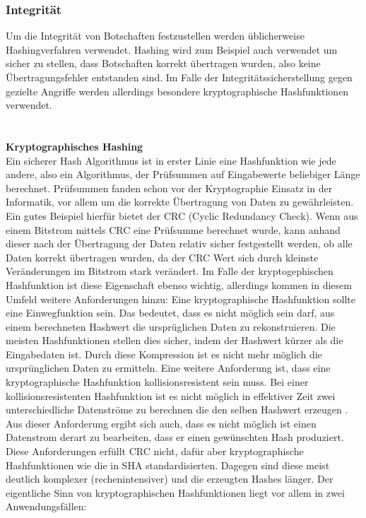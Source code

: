 \documentclass[13pt,a4paper,bibliography=totocnumbered,listof=totocnumbered]{scrartcl}
\begin{document}
\subsubsection{Integrität}
Um die Integrität von Botschaften festzustellen werden üblicherweise Hashingverfahren verwendet. Hashing wird zum Beispiel auch verwendet um sicher zu stellen, dass Botschaften korrekt übertragen wurden, also keine Übertragungsfehler entstanden sind. Im Falle der Integritätssicherstellung gegen gezielte Angriffe werden allerdings besondere kryptographische Hashfunktionen verwendet.\\
 \cite[S. 15]{48}  \cite[S. 2]{42}\\
\\\textbf{Kryptographisches Hashing}\\
Ein sicherer Hash Algorithmus ist in erster Linie eine Hashfunktion wie jede andere, also ein Algorithmus, der Prüfsummen auf Eingabewerte beliebiger Länge berechnet. Prüfsummen fanden schon vor der Kryptographie Einsatz in der Informatik, vor allem um die korrekte Übertragung von Daten zu gewährleisten. Ein gutes Beispiel hierfür bietet der CRC (Cyclic Redundancy Check). Wenn aus einem Bitstrom mittels CRC eine Prüfsumme berechnet wurde, kann anhand dieser nach der Übertragung der Daten relativ sicher festgestellt werden, ob alle Daten korrekt übertragen wurden, da der CRC Wert sich durch kleinste Veränderungen im Bitstrom stark verändert. Im Falle der kryptogephischen Hashfunktion ist diese Eigenschaft ebenso wichtig, allerdings kommen  in diesem Umfeld weitere Anforderungen hinzu: Eine kryptographische Hashfunktion sollte eine Einwegfunktion sein. Das bedeutet, dass es nicht möglich sein darf, aus einem berechneten Hashwert die ursprüglichen Daten zu rekonstruieren. Die meisten Hashfunktionen stellen dies sicher, indem der Hashwert kürzer als die Eingabedaten ist. Durch diese Kompression ist es nicht mehr möglich die ursprünglichen Daten zu ermitteln. Eine weitere Anforderung ist, dass eine kryptographische Hashfunktion kollisionsresistent sein muss. Bei einer kollisionsresistenten Hashfunktion ist es nicht möglich in effektiver Zeit zwei unterschiedliche Datenströme zu berechnen die den selben Hashwert erzeugen \cite[S. 4]{12}. Aus dieser Anforderung ergibt sich auch, dass es nicht möglich ist einen Datenstrom derart zu bearbeiten, dass er einen gewünschten Hash produziert. Diese Anforderungen erfüllt CRC nicht, dafür aber kryptographische Hashfunktionen wie die in SHA standardisierten. Dagegen sind diese meist deutlich komplexer (rechenintensiver) und die erzeugten Hashes länger. Der eigentliche Sinn von kryptographischen Hashfunktionen liegt vor allem in zwei Anwendungsfällen:\\
\end{document}
